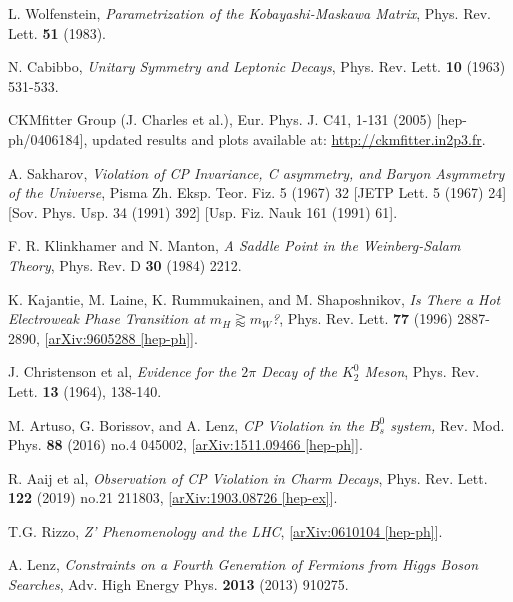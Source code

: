 \documentclass[a4paper,12pt]{article}
\begin{document}
\begin{thebibliography}{99}
L. Wolfenstein, \emph{Parametrization of the Kobayashi-Maskawa Matrix}, Phys. Rev. Lett. \textbf{51} (1983).%

N. Cabibbo, \emph{Unitary Symmetry and Leptonic Decays}, Phys. Rev. Lett. \textbf{10} (1963) 531-533.%

CKMfitter Group (J. Charles et al.), Eur. Phys. J. C41, 1-131 (2005) [hep-ph/0406184], updated results and plots available at: \href{http://ckmfitter.in2p3.fr}{http://ckmfitter.in2p3.fr}.

A. Sakharov, \emph{Violation of CP Invariance, C asymmetry, and Baryon Asymmetry of the Universe}, Pisma Zh. Eksp. Teor. Fiz. 5 (1967) 32 [JETP Lett. 5 (1967) 24] [Sov. Phys. Usp. 34 (1991) 392] [Usp. Fiz. Nauk 161 (1991) 61].

F. R. Klinkhamer and N. Manton, \emph{A Saddle Point in the Weinberg-Salam Theory}, Phys. Rev. D \textbf{30} (1984) 2212.%

K. Kajantie, M. Laine, K. Rummukainen, and M. Shaposhnikov, \emph{Is There a Hot Electroweak Phase Transition at $m_H\gtrapprox m_W$?}, Phys. Rev. Lett. \textbf{77} (1996) 2887-2890, [\href{https://arxiv.org/abs/hep-ph/9605288}{arXiv:9605288 [hep-ph]}].%

J. Christenson et al, \emph{Evidence for the $2\pi$ Decay of the $K_2^0$ Meson}, Phys. Rev. Lett. \textbf{13} (1964), 138-140.%

M. Artuso, G. Borissov, and A. Lenz, \emph{CP Violation in the $B_s^0$ system,} Rev. Mod. Phys. \textbf{88} (2016) no.4 045002, [\href{https://arxiv.org/abs/1511.09466}{arXiv:1511.09466 [hep-ph]}].%

R. Aaij et al, \emph{Observation of CP Violation in Charm Decays}, Phys. Rev. Lett. \textbf{122} (2019) no.21 211803, [\href{https://arxiv.org/abs/1903.08726}{arXiv:1903.08726 [hep-ex]}].%

T.G. Rizzo, \emph{Z' Phenomenology and the LHC}, [\href{https://arxiv.org/abs/hep-ph/0610104}{arXiv:0610104 [hep-ph]}].

A. Lenz, \emph{Constraints on a Fourth Generation of Fermions from Higgs Boson Searches}, Adv. High Energy Phys. \textbf{2013} (2013) 910275.%


\end{thebibliography}
\end{document}
